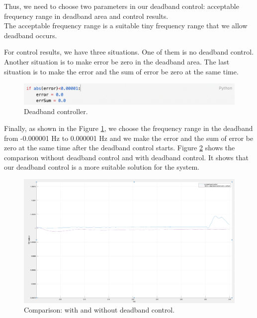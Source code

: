 \documentclass{report}
\begin{document}
Thus, we need to choose two parameters in our deadband control: acceptable frequency range in deadband area and control results.\\

The acceptable frequency range is a suitable tiny frequency range that we allow deadband occurs. 

For control results, we have three situations. One of them is no deadband control. Another situation is to make error be zero in the deadband area. The last situation is to make the error and the sum of error be zero at the same time. \\

\begin{figure}[htbp]
\centering
\includegraphics[width = .999\textwidth]{figure/3_3_deadband_code.png}
\caption{Deadband controller.}
\label{3_3_deadband_code}
\end{figure}

Finally, as shown in the Figure \textcolor{red}{\ref{3_3_deadband_code}}, we choose the frequency range in the deadband from -0.000001 Hz to 0.000001 Hz and we make the error and the sum of error be zero at the same time after the deadband control starts. Figure \textcolor{red}{\ref{3_3_deadband_result}} shows the comparison without deadband control and with deadband control. It shows that our deadband control is a more suitable solution for the system.\\

\begin{figure}[htbp]
\centering
\includegraphics[width = .999\textwidth]{figure/3_3_deadband_result.png}
\caption{Comparison: with and without deadband control.}
\label{3_3_deadband_result}
\end{figure}
\end{document}
